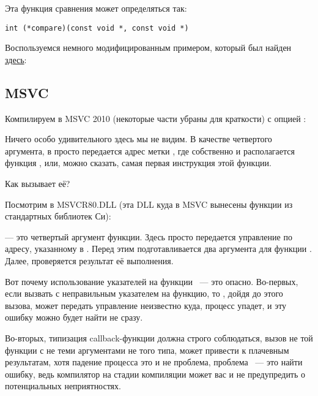 Эта функция сравнения может определяться так:

\begin{lstlisting}
int (*compare)(const void *, const void *)
\end{lstlisting}

Воспользуемся немного модифицированным примером, который был найден \href{http://go.yurichev.com/17079}{здесь}:



\subsection{MSVC}

Компилируем в MSVC 2010 (некоторые части убраны для краткости) с опцией \TT{\Ox}:



Ничего особо удивительного здесь мы не видим. В качестве четвертого аргумента, 
в \qsort просто передается адрес метки , где собственно и располагается функция \comp,
или, можно сказать, самая первая инструкция этой функции.

Как \qsort вызывает её?

Посмотрим в MSVCR80.DLL (эта DLL куда в MSVC вынесены функции из стандартных библиотек Си):



 --- это четвертый аргумент функции. 
Здесь просто передается управление по адресу, указанному в . 
Перед этим подготавливается два аргумента для функции \comp. 
Далее, проверяется результат её выполнения.

Вот почему использование указателей на функции ~--- это опасно. 
Во-первых, если вызвать \qsort с неправильным указателем на функцию, 
то \qsort, дойдя до этого вызова, может передать управление неизвестно куда, 
процесс упадет, и эту ошибку можно будет найти не сразу.

Во-вторых, типизация callback-функции должна строго соблюдаться, 
вызов не той функции с не теми аргументами не того типа, 
может привести к плачевным результатам, 
хотя падение процесса это и не проблема, проблема ~--- это найти ошибку, ведь компилятор 
на стадии компиляции может вас и не предупредить о потенциальных неприятностях.

